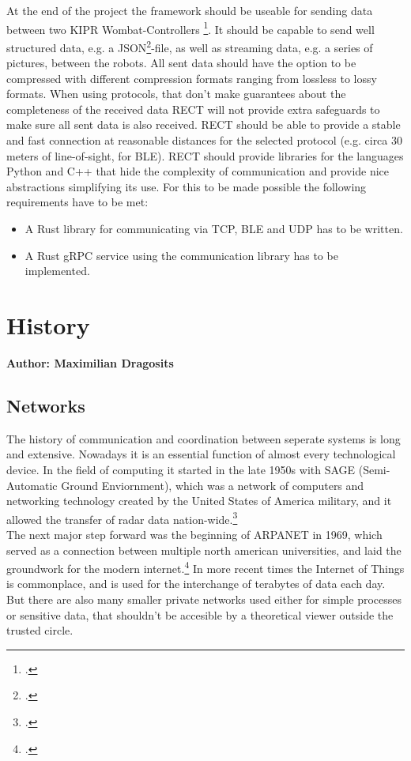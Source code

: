 At the end of the project the framework should be useable for sending data between two KIPR Wombat-Controllers \footcite{wombat-controller}. It should be capable
to send well structured data, e.g. a JSON\footcite{json}-file, as well as streaming data, e.g. a series of pictures, between the robots. All sent data should have the
option to be compressed with different compression formats ranging from lossless to lossy formats. When using protocols, that don't make guarantees about
the completeness of the received data RECT will not provide extra safeguards to make sure all sent data is also received.
RECT should be able to provide a stable and fast connection at reasonable distances for the selected protocol (e.g. circa 30 meters of line-of-sight, for BLE).
RECT should provide libraries for the languages Python and C++ that hide the complexity of communication and provide nice abstractions simplifying its use.
For this to be made possible the following requirements have to be met:
\begin{itemize}
\item A Rust library for communicating via TCP, BLE and UDP has to be written.
\item A Rust gRPC service using the communication library has to be implemented.
\end{itemize}

\section{History}
\textbf{Author: Maximilian Dragosits}
\subsection{Networks}
The history of communication and coordination between seperate systems is long and extensive. Nowadays it is an essential 
function of almost every technological device. In the field of computing it started in the late 1950s with SAGE (Semi-Automatic Ground Enviornment),
which was a network of computers and networking technology created by the United States of America military, 
and it allowed the transfer of radar data nation-wide.\footcite[][89]{A_New_History_of_Modern_Computing}\\
The next major step forward was the beginning of ARPANET in 1969, which served as a connection between multiple north american 
universities, and laid the groundwork for the modern internet.\footcite[][25]{How_the_web_was_born}
In more recent times the Internet of Things is commonplace, and is used for the interchange of terabytes of data each day. 
But there are also many smaller private networks used either for simple processes or sensitive data, that shouldn't be 
accesible by a theoretical viewer outside the trusted circle. 

